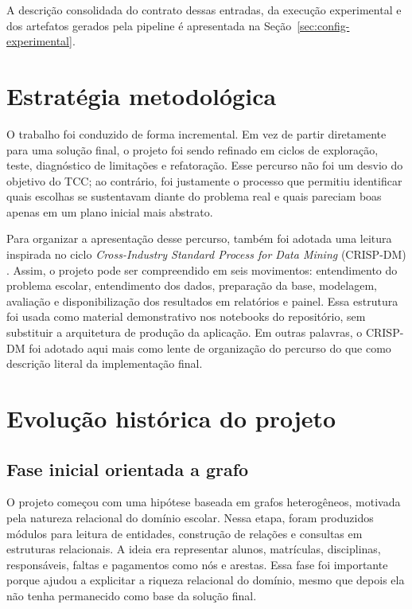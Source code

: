 A descri\c{c}\~ao consolidada do contrato dessas entradas, da execu\c{c}\~ao experimental e dos artefatos gerados pela pipeline \'e apresentada na Se\c{c}\~ao~\ref{sec:config-experimental}.

\section{Estrat\'egia metodol\'ogica}
\label{sec:estrategia-metodologica}

O trabalho foi conduzido de forma incremental. Em vez de partir diretamente para uma solu\c{c}\~ao final, o projeto foi sendo refinado em ciclos de explora\c{c}\~ao, teste, diagn\'ostico de limita\c{c}\~oes e refatora\c{c}\~ao. Esse percurso n\~ao foi um desvio do objetivo do TCC; ao contr\'ario, foi justamente o processo que permitiu identificar quais escolhas se sustentavam diante do problema real e quais pareciam boas apenas em um plano inicial mais abstrato.

Para organizar a apresenta\c{c}\~ao desse percurso, tamb\'em foi adotada uma leitura inspirada no ciclo \textit{Cross-Industry Standard Process for Data Mining} (CRISP-DM) \cite{wirth2000}. Assim, o projeto pode ser compreendido em seis movimentos: entendimento do problema escolar, entendimento dos dados, prepara\c{c}\~ao da base, modelagem, avalia\c{c}\~ao e disponibiliza\c{c}\~ao dos resultados em relat\'orios e painel. Essa estrutura foi usada como material demonstrativo nos notebooks do reposit\'orio, sem substituir a arquitetura de produ\c{c}\~ao da aplica\c{c}\~ao. Em outras palavras, o CRISP-DM foi adotado aqui mais como lente de organiza\c{c}\~ao do percurso do que como descri\c{c}\~ao literal da implementa\c{c}\~ao final.

\section{Evolu\c{c}\~ao hist\'orica do projeto}
\label{sec:evolucao-historica}

\subsection{Fase inicial orientada a grafo}
\label{subsec:fase-grafo}

O projeto come\c{c}ou com uma hip\'otese baseada em grafos heterog\^eneos, motivada pela natureza relacional do dom\'inio escolar. Nessa etapa, foram produzidos m\'odulos para leitura de entidades, constru\c{c}\~ao de rela\c{c}\~oes e consultas em estruturas relacionais. A ideia era representar alunos, matr\'iculas, disciplinas, respons\'aveis, faltas e pagamentos como n\'os e arestas. Essa fase foi importante porque ajudou a explicitar a riqueza relacional do dom\'inio, mesmo que depois ela n\~ao tenha permanecido como base da solu\c{c}\~ao final.

